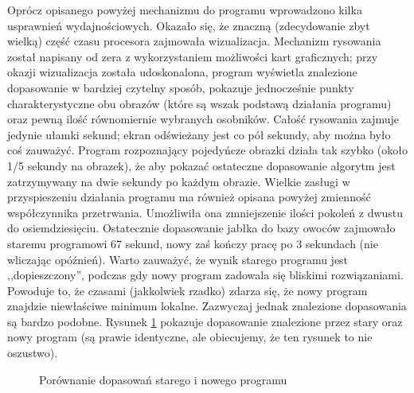 \documentclass[a4paper,12pt,leqno]{article}
\begin{document}
Oprócz opisanego powyżej mechanizmu do programu wprowadzono kilka usprawnień wydajnościowych. Okazało się, że znaczną (zdecydowanie zbyt wielką) część czasu procesora zajmowała
wizualizacja. Mechanizm rysowania został napisany od zera z wykorzystaniem możliwości kart graficznych; przy okazji wizualizacja została udoskonalona, program wyświetla znalezione
dopasowanie w bardziej czytelny sposób, pokazuje jednocześnie punkty charakterystyczne obu obrazów (które są wszak podstawą działania programu) oraz pewną ilość równomiernie wybranych
osobników. Całość rysowania zajmuje jedynie ułamki sekund; ekran odświeżany jest co pół sekundy, aby można było coś zauważyć. Program rozpoznający pojedyńcze obrazki działa tak szybko
(około 1/5 sekundy na obrazek), że aby pokazać ostateczne dopasowanie algorytm jest zatrzymywany na dwie sekundy po każdym obrazie. Wielkie zasługi w przyspieszeniu działania programu
ma również opisana powyżej zmienność współczynnika przetrwania. Umożliwiła ona zmniejszenie ilości pokoleń z dwustu do osiemdziesięciu. Ostatecznie dopasowanie jabłka do bazy owoców
zajmowało staremu programowi 67 sekund, nowy zaś kończy pracę po 3 sekundach (nie wliczając opóźnień). Warto zauważyć, że wynik starego programu jest ,,dopieszczony'', podczas gdy nowy
program zadowala się bliskimi rozwiązaniami. Powoduje to, że czasami (jakkolwiek rzadko) zdarza się, że nowy program znajdzie niewłaściwe minimum lokalne. Zazwyczaj jednak znalezione
dopasowania są bardzo podobne. Rysunek \ref{speedy} pokazuje dopasowanie znalezione przez stary oraz nowy program (są prawie identyczne, ale obiecujemy, że ten rysunek to nie oszustwo).

\begin{figure}\centering
{}\hspace{1mm}
\hspace{1mm}
\caption{Porównanie dopasowań starego i nowego programu}{\label{speedy}}
\end{figure}
\end{document}
